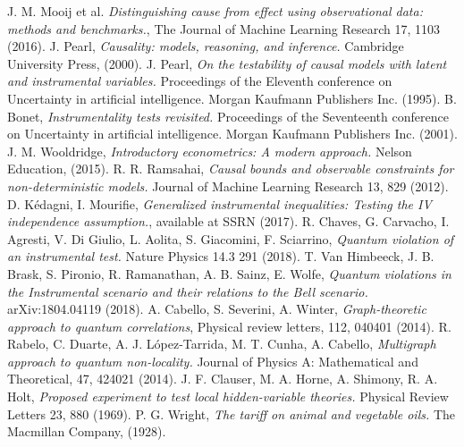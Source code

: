 \documentclass[letterpaper]{article}
\begin{document}
\begin{thebibliography}{}
     J. M. Mooij et al.
        {\em Distinguishing cause from effect using observational data: methods and benchmarks.}, 
        The Journal of Machine Learning Research 17, 1103 (2016).
     J. Pearl, 
        {\em Causality: models, reasoning, and inference.}
        Cambridge University Press, (2000).
     J. Pearl, 
        {\em On the testability of causal models with latent and instrumental variables.}
        Proceedings of the Eleventh conference on Uncertainty in artificial
        intelligence. Morgan Kaufmann Publishers Inc. (1995).
     B. Bonet, 
        {\em Instrumentality tests revisited.}
        Proceedings of the Seventeenth conference on Uncertainty in artificial
        intelligence. Morgan Kaufmann Publishers Inc. (2001).
     J. M. Wooldridge, 
        {\em Introductory econometrics: A modern approach.} 
        Nelson Education, (2015).
     R. R. Ramsahai, 
        {\em Causal bounds and observable constraints for non-deterministic models.}
        Journal of Machine Learning Research 13, 829 (2012).
      D. Kédagni, I. Mourifie, 
        {\em Generalized instrumental inequalities: Testing the IV independence assumption.}, 
        available at SSRN (2017).
     R. Chaves, G. Carvacho, I. Agresti, V. Di Giulio, L. Aolita, S. Giacomini, F. Sciarrino, 
        {\em Quantum violation of an instrumental test.} 
        Nature Physics 14.3 291 (2018).
      T. Van Himbeeck, J. B. Brask, S. Pironio, R. Ramanathan, A. B. Sainz, E. Wolfe, 
        {\em Quantum violations in the Instrumental scenario and their relations to the Bell scenario.}
        arXiv:1804.04119 (2018).
      A. Cabello, S. Severini, A. Winter,
         {\em Graph-theoretic approach to quantum correlations}, 
         Physical review letters, 112, 040401 (2014).
      R. Rabelo, C. Duarte, A. J.  López-Tarrida, M. T. Cunha, A. Cabello,
         {\em Multigraph approach to quantum non-locality.}
         Journal of Physics A: Mathematical and Theoretical, 47, 424021 (2014).
     J. F. Clauser, M. A. Horne, A. Shimony, R. A. Holt, 
        {\em Proposed experiment to test local hidden-variable theories.}
        Physical Review Letters 23, 880 (1969).
     P. G. Wright, 
        {\em The tariff on animal and vegetable oils.} 
        The Macmillan Company, (1928).

\end{thebibliography}
\end{document}
